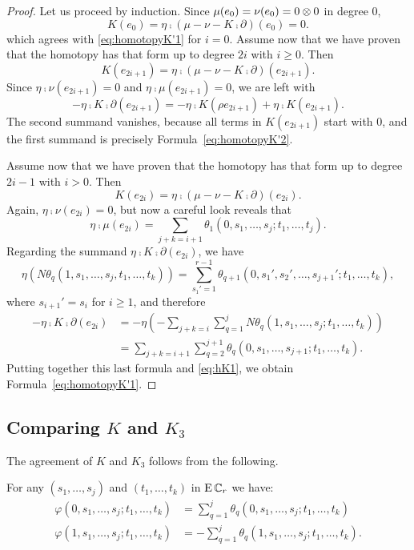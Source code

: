 \begin{proof}
 	Let us proceed by induction.
	Since $\mu(e_0) = \nu(e_0) = 0\otimes 0$ in degree $0$,
	\[
	K(e_0) = \eta \comp (\mu-\nu-K \comp \partial)(e_0) = 0.
	\]
	which agrees with \eqref{eq:homotopyK'1} for $i=0$.
	Assume now that we have proven that the homotopy has that form up to degree $2i$ with $i\geq 0$.
	Then
	\[K(e_{2i+1}) = \eta \comp (\mu-\nu-K \comp \partial)(e_{2i+1}).\]
	Since $\eta \comp \nu(e_{2i+1}) = 0$ and $\eta \comp \mu(e_{2i+1}) = 0$, we are left with
	\[-\eta \comp K \comp \partial(e_{2i+1}) = -\eta \comp K (\rho e_{2i+1}) + \eta \comp K (e_{2i+1}).
	\]
	The second summand vanishes, because all terms in $K(e_{2i+1})$ start with $0$, and the first summand is precisely Formula~\eqref{eq:homotopyK'2}.

	Assume now that we have proven that the homotopy has that form up to degree $2i-1$ with $i>0$.
	Then
	\[K(e_{2i}) = \eta \comp (\mu-\nu-K \comp \partial)(e_{2i}).\]
	Again, $\eta \comp \nu(e_{2i}) = 0$, but now a careful look reveals that
	\begin{equation}\label{eq:hK1}
		\eta \comp \mu(e_{2i}) = \sum_{j+k=i+1}\theta_1(0,s_1,\dots,s_j;t_1,\dots,t_j).
	\end{equation}
	Regarding the summand $\eta \comp K \comp \partial(e_{2i})$, we have
	\[\eta(N\theta_q(1,s_1,\dots,s_j,t_1,\dots,t_k)) = \sum_{s_1' = 1}^{r-1}\theta_{q+1}(0,s_1',s_2',\dots,s_{j+1}';t_1,\dots,t_k),\]
	where $s_{i+1}' = s_i$ for $i\geq 1$, and therefore
	\begin{align*}\label{eq:hK2}
		-\eta \comp K \comp \partial(e_{2i}) &=
		-\eta\left(-\sum_{j+k = i}\sum_{q=1}^j N\theta_q(1,s_1,\dots,s_j;t_1,\dots,t_k)\right) \\ &=
		\sum_{j+k = i+1}\sum_{q=2}^{j+1}\theta_q(0,s_1,\dots,s_{j+1};t_1,\dots,t_k).
	\end{align*}
	Putting together this last formula and \eqref{eq:hK1}, we obtain Formula~\eqref{eq:homotopyK'1}.
\end{proof}

\subsection{Comparing $K$ and $K_3$}\label{ss:comparins K and K3}

The agreement of $K$ and $K_3$ follows from the following.

\begin{lemma}
	For any $(s_1,\dots,s_j)$ and $(t_1,\dots,t_k)$ in $\operatorname{E}\mathbb{C}_r$ we have:
	\begin{align*}
		\varphi(0,s_1,\dots,s_j;t_1,\dots,t_k) &= \sum_{q=1}^j \theta_q(0,s_1,\dots,s_j;t_1,\dots,t_k) \\
		\varphi(1,s_1,\dots,s_j;t_1,\dots,t_k) &= -\sum_{q=1}^j \theta_q(1,s_1,\dots,s_j;t_1,\dots,t_k).
	\end{align*}
\end{lemma}

